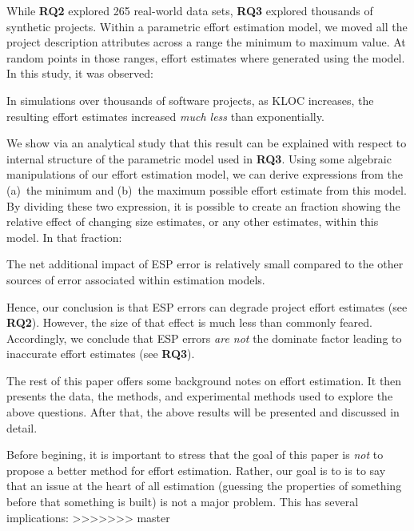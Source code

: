 \documentclass[final,twocolumn]{elsarticle}
\theoremstyle{break}
\begin{document}
While {\bf RQ2} explored 265 real-world data sets, {\bf RQ3} explored thousands
of synthetic projects.  Within a parametric effort estimation model, we moved
all the project description attributes
across a range the minimum to maximum value. At random
points in those ranges, effort estimates where generated using the model.  In this
study, it was observed:

\begin{lesson0}
  In simulations over thousands of software projects,
  as KLOC increases, the resulting effort estimates increased {\em much less} than exponentially.
\end{lesson0}

We show via an analytical study 
that this result can be explained with respect to internal structure
of the parametric model used in {\bf RQ3}. Using some algebraic manipulations of
our effort estimation model,
we can derive expressions from
 the (a)~the minimum and (b)~the
maximum possible effort estimate from this model.
By dividing these two expression, it is possible to create an fraction showing
the relative effect of changing size estimates, or any other estimates, within this model.
In that fraction:

\begin{lesson0}
  The net additional impact of ESP error is relatively small compared to the other sources of error associated within estimation models.
\end{lesson0}
Hence, our conclusion is that
ESP errors can degrade project
effort estimates (see {\bf RQ2}). However, the size of that effect is much less than commonly feared.
Accordingly, we conclude that  ESP errors {\em are not} the dominate factor leading
to inaccurate effort estimates (see {\bf RQ3}). 

The rest of this paper  offers some background notes on effort estimation.
It then presents the data, the methods, and experimental methods
used to explore the above questions. After that, the above results will be presented
and discussed in detail.

Before begining, it is important to stress
that the goal of this paper is {\em not} to propose a better method for effort
estimation.  Rather, our goal is to is to say that an issue at the heart of all
estimation (guessing the properties of something before that something is built)
is not a major problem. This has several implications:
>>>>>>> master
\end{document}
